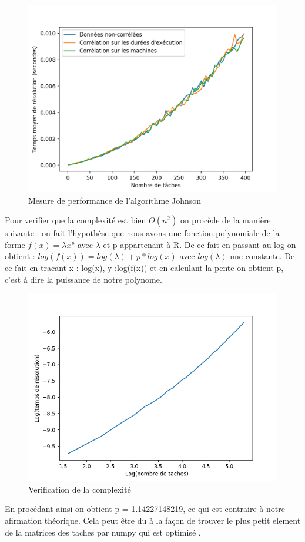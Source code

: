 \documentclass[a4paper, 10pt]{article}
\begin{document}
		\begin{figure}[H]
			\centering
			\includegraphics[width=0.85\linewidth]{graphes/Johnson.png}
			\caption{Mesure de performance de l'algorithme Johnson}
			\label{fig:tj}
		\end{figure}

                Pour verifier que la complexité est bien $O(n^2)$ on procède de la manière suivante : on fait l'hypothèse que nous avons une fonction polynomiale de la forme $f(x) = \lambda x^p$ avec $\lambda$ et p appartenant à R.
                De ce fait en passant au log on obtient : $log(f(x)) = log(\lambda) + p*log(x)$ avec $log(\lambda)$ une constante. De ce fait en tracant x : log(x), y :log(f(x)) et en calculant la pente on obtient p, c'est à dire la puissance de notre polynome.

                \begin{figure}[H]
			\centering
			\includegraphics[width=0.8\linewidth]{graphes/verification_Johnson.png}
			\caption{Verification de la complexité}
			\label{fig:??}
		\end{figure}
                En procédant ainsi on obtient p = 1.14227148219, ce qui est contraire à notre afirmation théorique. Cela peut être du à la façon de trouver le plus petit element de la matrices des taches par numpy qui est optimisé .
                
\end{document}
